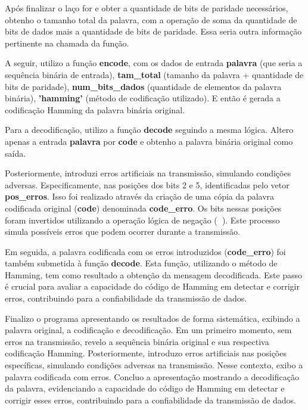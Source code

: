 \documentclass{article}
\begin{document}
Após finalizar o laço for e obter a quantidade de bits de paridade necessários, obtenho o tamanho total da palavra, com a operação de soma da quantidade de bits de dados mais a quantidade de bits de paridade. Essa seria outra informação pertinente na chamada da função.

A seguir, utilizo a função \textbf{encode}, com os dados de entrada \textbf{palavra} (que seria a sequência binária de entrada), \textbf{tam\_total} (tamanho da palavra + quantidade de bits de paridade), \textbf{num\_bits\_dados} (quantidade de elementos da palavra binária), \textbf{'hamming'} (método de codificação utilizado). E então é gerada a codificação Hamming da palavra binária original.

Para a decodificação, utilizo a função \textbf{decode} seguindo a mesma lógica. Altero apenas a entrada \textbf{palavra} por \textbf{code} e obtenho a palavra binária original como saída.

Posteriormente, introduzi erros artificiais na transmissão, simulando condições adversas. Especificamente, nas posições dos bits 2 e 5, identificadas pelo vetor \textbf{pos\_erros}. Isso foi realizado através da criação de uma cópia da palavra codificada original (\textbf{code}) denominada \textbf{code\_erro}. Os bits nessas posições foram invertidos utilizando a operação lógica de negação (\textbf{~}). Este processo simula possíveis erros que podem ocorrer durante a transmissão.

Em seguida, a palavra codificada com os erros introduzidos (\textbf{code\_erro}) foi também submetida à função \textbf{decode}. Esta função, utilizando o método de Hamming, tem como resultado a obtenção da mensagem decodificada. Este passo é crucial para avaliar a capacidade do código de Hamming em detectar e corrigir erros, contribuindo para a confiabilidade da transmissão de dados.

Finalizo o programa apresentando os resultados de forma sistemática, exibindo a palavra original, a codificação e decodificação. Em um primeiro momento, sem erros na transmissão, revelo a sequência binária original e sua respectiva codificação Hamming. Posteriormente, introduzo erros artificiais nas posições específicas, simulando condições adversas na transmissão. Nesse contexto, exibo a palavra codificada com erros. Concluo a apresentação mostrando a decodificação da palavra, evidenciando a capacidade do código de Hamming em detectar e corrigir esses erros, contribuindo para a confiabilidade da transmissão de dados.
\end{document}
